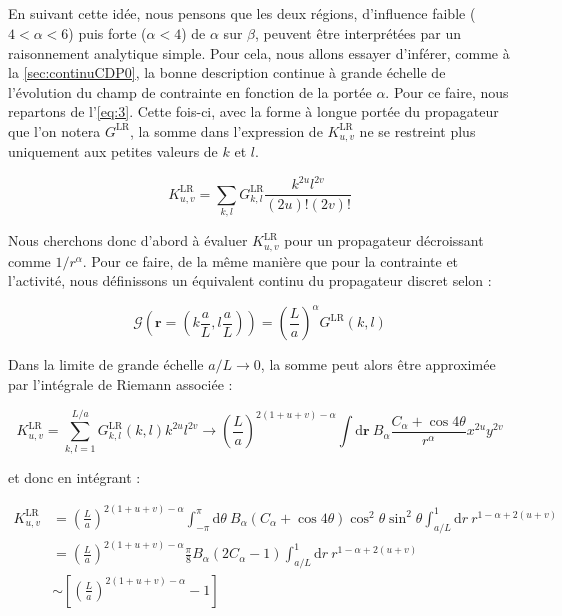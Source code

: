 \subparagraph{}En suivant cette idée, nous pensons que les deux régions, d'influence faible ($4<\alpha < 6$) puis forte ($\alpha < 4$) de $\alpha$ sur $\beta$, peuvent être interprétées par un raisonnement analytique simple. Pour cela, nous allons essayer d'inférer, comme à la \autoref{sec:continuCDP0}, la bonne description continue à grande échelle de l'évolution du champ de contrainte en fonction de la portée $\alpha$. Pour ce faire, nous repartons de l'\autoref{eq:3}. Cette fois-ci, avec la forme à longue portée du propagateur que l'on notera $G^\text{LR}$, la somme dans l'expression de $K^\text{LR}_{u,v}$ ne se restreint plus uniquement aux petites valeurs de $k$ et $l$. 

\begin{equation}
	K^\text{LR}_{u,v} = \sum_{k,l}G^\text{LR}_{k,l}\frac{k^{2u}l^{2v}}{(2u)!(2v)!}
	\label{eq:sommekuv}
\end{equation}

Nous cherchons donc d'abord à évaluer $K^\text{LR}_{u,v}$ pour un propagateur décroissant comme $1/r^\alpha$. Pour ce faire, de la même manière que pour la contrainte et l'activité, nous définissons un équivalent continu du propagateur discret selon :

\begin{equation}
    \mathcal{G}\left(\mathbf{r}=(k\frac{a}{L},l\frac{a}{L})\right) = \left(\frac{L}{a}\right)^\alpha G^\text{LR}(k,l)
    \label{eq:rescaled:propagator}
\end{equation}

\noindent Dans la limite de grande échelle $a/L \rightarrow 0$, la somme peut  alors être approximée par l'intégrale de Riemann associée :

\begin{equation}
    K^\text{LR}_{u,v} = \sum_{k,l = 1}^{L/a}G_{k,l}^\text{LR}(k,l)k^{2u}l^{2v}
    \rightarrow \left(\frac{L}{a}\right)^{2(1+u+v)-\alpha}\int \mathrm{d}\mathbf{r}~B_\alpha\frac{C_\alpha+\cos 4\theta}{r^\alpha}x^{2u}y^{2v}
\end{equation}

\noindent et donc en intégrant :

\begin{equation}
\begin{aligned}
    K^\text{LR}_{u,v} &= \left(\frac{L}{a}\right)^{2(1+u+v)-\alpha}\int_{-\pi}^\pi \mathrm{d}\theta~B_\alpha(C_\alpha+\cos 4\theta)\cos^2\theta\sin^2\theta \int_{a/L}^1 \mathrm{d}r ~ r^{1-\alpha+2(u+v)}\\
    &=\left(\frac{L}{a}\right)^{2(1+u+v)-\alpha}\frac{\pi}{8}B_\alpha(2C_\alpha-1)\int_{a/L}^1 \mathrm{d}r ~ r^{1-\alpha+2(u+v)}\\
    &\sim \left[ \left(\frac{L}{a}\right)^{2(1+u+v)-\alpha}-1 \right]
    \label{eq:eval:I}
\end{aligned}
\end{equation}

